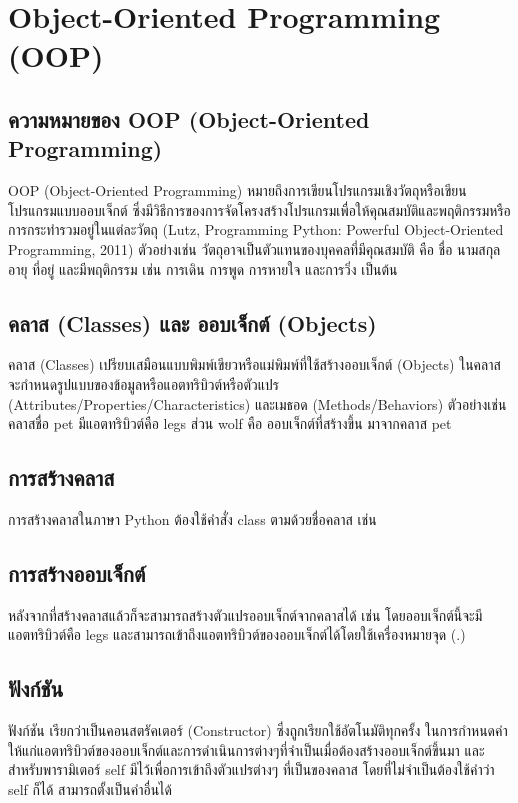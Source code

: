 \chapter{Object-Oriented Programming (OOP)}
\section{ความหมายของ OOP (Object-Oriented Programming)}

OOP (Object-Oriented Programming) หมายถึงการเขียนโปรแกรมเชิงวัตถุหรือเขียนโปรแกรมแบบออบเจ็กต์ ซึ่งมีวิธีการของการจัดโครงสร้างโปรแกรมเพื่อให้คุณสมบัติและพฤติกรรมหรือการกระทำรวมอยู่ในแต่ละวัตถุ (Lutz, Programming Python: Powerful Object-Oriented Programming, 2011) ตัวอย่างเช่น วัตถุอาจเป็นตัวแทนของบุคคลที่มีคุณสมบัติ คือ ชื่อ นามสกุล อายุ ที่อยู่ และมีพฤติกรรม เช่น การเดิน การพูด การหายใจ และการวิ่ง เป็นต้น

\section{คลาส (Classes) และ ออบเจ็กต์ (Objects)}

คลาส (Classes) เปรียบเสมือนแบบพิมพ์เขียวหรือแม่พิมพ์ที่ใช้สร้างออบเจ็กต์ (Objects) ในคลาสจะกำหนดรูปแบบของข้อมูลหรือแอตทริบิวต์หรือตัวแปร (Attributes/Properties/Characteristics) และเมธอด (Methods/Behaviors) ตัวอย่างเช่น คลาสชื่อ pet มีแอตทริบิวต์คือ legs ส่วน wolf คือ ออบเจ็กต์ที่สร้างขึ้น มาจากคลาส pet 

\section{การสร้างคลาส}

การสร้างคลาสในภาษา Python ต้องใช้คำสั่ง class ตามด้วยชื่อคลาส เช่น

\section{การสร้างออบเจ็กต์}

หลังจากที่สร้างคลาสแล้วก็จะสามารถสร้างตัวแปรออบเจ็กต์จากคลาสได้ เช่น  โดยออบเจ็กต์นี้จะมีแอตทริบิวต์คือ legs และสามารถเข้าถึงแอตทริบิวต์ของออบเจ็กต์ได้โดยใช้เครื่องหมายจุด (.) 

\section{ฟังก์ชัน }

ฟังก์ชัน  เรียกว่าเป็นคอนสตรัคเตอร์  (Constructor) ซึ่งถูกเรียกใช้อัตโนมัติทุกครั้ง ในการกำหนดค่าให้แก่แอตทริบิวต์ของออบเจ็กต์และการดำเนินการต่างๆที่จำเป็นเมื่อต้องสร้างออบเจ็กต์ขึ้นมา และสำหรับพารามิเตอร์ self มีไว้เพื่อการเข้าถึงตัวแปรต่างๆ ที่เป็นของคลาส โดยที่ไม่จำเป็นต้องใช้คำว่า self ก็ได้ สามารถตั้งเป็นคำอื่นได้

